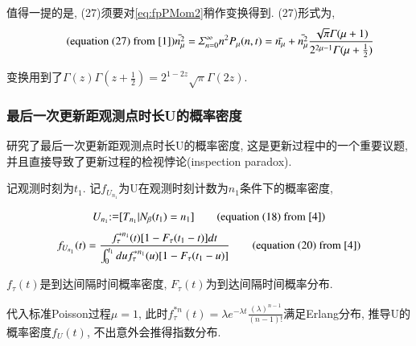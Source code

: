 \documentclass[a4paper, 12pt]{ctexart}
\begin{document}
值得一提的是, \cite{1}(27)须要对\eqref{eq:fpPMom2}稍作变换得到. \cite{1}(27)形式为,
\begin{equation}
\tag{equation (27) from \cite{1}}
\bar{n_\mu ^2}=\Sigma_{n=0}^\infty n^2 P_\mu (n,t)=\bar{n_\mu}+\bar{n_\mu ^2}\frac{\sqrt{\pi}\Gamma(\mu +1)}{2^{2\mu -1}\Gamma(\mu+\frac{1}{2})}
\end{equation}

变换用到了$\Gamma(z)\Gamma(z+\frac{1}{2})=2^{1-2z}\sqrt{\pi}\Gamma(2z)$.

\subsubsection{最后一次更新距观测点时长U的概率密度}
\cite{4}研究了最后一次更新距观测点时长U的概率密度, 这是更新过程中的一个重要议题, 并且直接导致了更新过程的检视悖论(inspection paradox). 

记观测时刻为$t_1$. 记$f_{U_{n_1}}$为U在观测时刻计数为$n_1$条件下的概率密度,

\begin{equation}
U_{n_1}{:\mathrel{\mathop=}}[T_{n_1}|N_\beta(t_1)=n_1]\tag{equation (18) from \cite{4}}
\end{equation}
\begin{equation}
f_{U_{n_1}}(t)=\frac{f_\tau^{\ast n_1}(t)[1-F_\tau(t_1-t)]dt}{\int_0^{t_1}duf_\tau^{\ast n_1}(u)[1-F_\tau(t_1-u)]}\label{equation (20) from [4]}\tag{equation (20) from \cite{4}}
\end{equation}

$f_\tau (t)$是到达间隔时间概率密度, $F_\tau(t)$为到达间隔时间概率分布.

代入标准Poisson过程$\mu=1$, 此时$f_\tau^{\ast n}(t)=\lambda e^{-\lambda t}\frac{(\lambda)^{n-1}}{(n-1)!}$满足Erlang分布, 推导U的概率密度$f_U(t)$, 不出意外会推得指数分布.  
\end{document}
